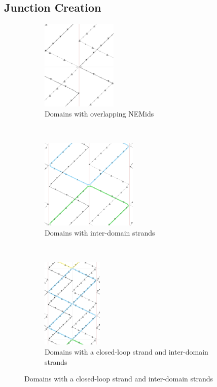 \documentclass[titlepage]{article}
\begin{document}
	\subsection{Junction Creation}
	\begin{figure}[h]
		\centering
		\caption{Creating cross-strand junctions}
		\label{fig:creating-junctions}
		
		\begin{subfigure}{.3\textwidth}
			\centering
			\includegraphics[height=1.7in]{creating-junctions-1.png}
			\caption{Domains with overlapping NEMids}
		\end{subfigure}%
		~
		\begin{subfigure}{.3\textwidth}
			\centering
			\includegraphics[height=1.7in]{creating-junctions-2.png}
			\caption{Domains with inter-domain strands}
		\end{subfigure}%
		~
		\begin{subfigure}{.3\textwidth}
			\centering
			\includegraphics[height=1.7in]{creating-junctions-3.png}
			\caption{Domains with a closed-loop strand and inter-domain strands}
		\end{subfigure}
	\end{figure}
	
\end{document}
